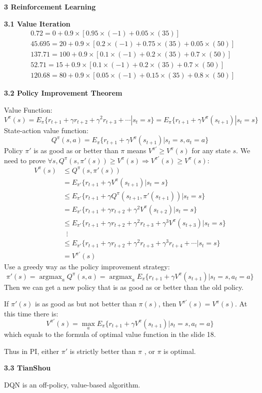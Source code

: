 \documentclass[12pt]{article}
\begin{document}
\newpage
{\large \bf 3 Reinforcement Learning}
\bigskip \par
{\bf 3.1 Value Iteration}
\begin{align*}
&0.72=0+0.9\times[0.95\times(-1)+0.05\times(35)]\\
&45.695=20+0.9\times[0.2\times(-1)+0.75\times(35)+0.05\times(50)]\\
&137.71=100+0.9\times[0.1\times(-1)+0.2\times(35)+0.7\times(50)]\\
&52.71=15+0.9\times[0.1\times(-1)+0.2\times(35)+0.7\times(50)]\\
&120.68=80+0.9\times[0.05\times(-1)+0.15\times(35)+0.8\times(50)]
\end{align*}

\bigskip \par
{\bf 3.2 Policy Improvement Theorem}
\bigskip \par
Value Function: 
$$V^\pi(s)=E_\pi\{r_{t+1}+\gamma r_{t+2}+\gamma^2 r_{t+3}+\cdots|s_t=s\}=E_\pi\{r_{t+1}+\gamma V^\pi(s_{t+1})|s_t=s\}$$
State-action value function:
$$Q^\pi(s,a)=E_\pi\{r_{t+1}+\gamma V^\pi(s_{t+1})|s_t=s,a_t=a\}$$
Policy $\pi'$ is as good as or better than $\pi$ means $V^{\pi'}\geq V^\pi(s)$ for any state $s$. We need to prove $\forall s, Q^\pi\left(s,\pi'(s)\right)\geq V^\pi(s)\Rightarrow V^{\pi'}(s)\geq V^\pi(s)$:
\begin{align*}
V^\pi(s)&\leq Q^\pi(s,\pi'(s))\\
&=E_{\pi'}\{r_{t+1}+\gamma V^\pi(s_{t+1})|s_t=s\}\\
&\leq E_{\pi'}\{r_{t+1}+\gamma Q^\pi(s_{t+1},\pi'(s_{t+1}))|s_t=s\}\\
&= E_{\pi'}\{r_{t+1}+\gamma r_{t+2}+\gamma^2V^\pi(s_{t+2})|s_t=s\}\\
&\leq E_{\pi'}\{r_{t+1}+\gamma r_{t+2}+\gamma^2 r_{t+3}+\gamma^3V^\pi(s_{t+3})|s_t=s\}\\
&\;\;\vdots\\
&\leq E_{\pi'}\{r_{t+1}+\gamma r_{t+2}+\gamma^2 r_{t+3}+\gamma^3 r_{t+4} + \cdots|s_t=s\}\\
&=V^{\pi'}(s)
\end{align*}
Use a greedy way as the policy improvement strategy:
$$\pi'(s)=\mathop{\arg\max}_aQ^\pi(s,a)=\mathop{\arg\max}_aE_\pi\{r_{t+1}+\gamma V^\pi(s_{t+1})|s_t=s,a_t=a\}$$
Then we can get a new policy that is as good as or better than the old policy.
\par
If $\pi'(s)$ is as good as but not better than $\pi(s)$, then $V^{\pi'}(s)=V^{\pi}(s)$. At this time there is:
$$V^{\pi'}(s)=\max_aE_\pi\{r_{t+1}+\gamma V^\pi(s_{t+1})|s_t=s,a_t=a\}$$
which equals to the formula of optimal value function in the slide 18.
\par Thus in PI, either $\pi'$ is strictly better than $\pi$ , or $\pi$ is optimal.

\bigskip \par
{\bf 3.3 TianShou}
\bigskip \par
DQN is an off-policy, value-based algorithm.
\par
\end{document}
